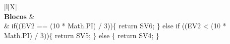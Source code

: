 \begin{xltabular}{\textwidth}{|l|X|}
		 \\ \hline
		\textbf{Blocos} &  \\ \hline
		 & if((EV2 == (10 * Math.PI) / 3))\{   return SV6; \} else if ((EV2 < (10 * Math.PI) / 3))\{   return SV5; \} else \{   return SV4; \} \\ \hline



\end{xltabular}
